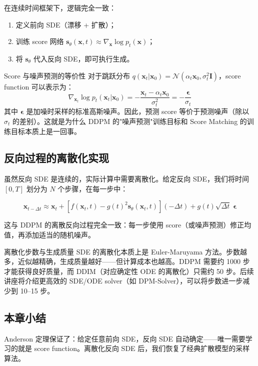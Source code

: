 在连续时间框架下，逻辑完全一致：
\begin{enumerate}
    \item 定义前向 SDE（漂移 + 扩散）；
    \item 训练 score 网络 $\mathbf{s}_\theta(\mathbf{x}, t) \approx \nabla_{\mathbf{x}} \log p_t(\mathbf{x})$；
    \item 将 $\mathbf{s}_\theta$ 代入反向 SDE，即可执行生成。
\end{enumerate}

\begin{knowledgebox}{Score 与噪声预测的等价性}
对于跳跃分布 $q(\mathbf{x}_t | \mathbf{x}_0) = \mathcal{N}(\alpha_t \mathbf{x}_0, \sigma_t^2 \mathbf{I})$，score function 可以表示为：
$$
\nabla_{\mathbf{x}_t} \log p_t(\mathbf{x}_t | \mathbf{x}_0) = -\frac{\mathbf{x}_t - \alpha_t \mathbf{x}_0}{\sigma_t^2} = -\frac{\boldsymbol{\epsilon}}{\sigma_t}
$$
其中 $\boldsymbol{\epsilon}$ 是加噪时采样的标准高斯噪声。因此，预测 score 等价于预测噪声（除以 $\sigma_t$ 的差别）。这就是为什么 DDPM 的"噪声预测"训练目标和 Score Matching 的训练目标本质上是一回事。
\end{knowledgebox}

\subsection{反向过程的离散化实现}

虽然反向 SDE 是连续的，实际计算中需要离散化。给定反向 SDE，我们将时间 $[0, T]$ 划分为 $N$ 个步骤，在每一步中：

$$
\mathbf{x}_{t-\Delta t} \approx \mathbf{x}_t + \left[f(\mathbf{x}_t, t) - g(t)^2 \mathbf{s}_\theta(\mathbf{x}_t, t)\right](-\Delta t) + g(t)\sqrt{\Delta t}\;\boldsymbol{\epsilon}
$$

这与 DDPM 的离散反向过程完全一致：每一步使用 score（或噪声预测）修正均值，再添加适当的随机噪声。

\begin{warningbox}{离散化步数与生成质量}
SDE 的离散化本质上是 Euler-Maruyama 方法。步数越多，近似越精确，生成质量越好——但计算成本也越高。DDPM 需要约 1000 步才能获得良好质量，而 DDIM（对应确定性 ODE 的离散化）只需约 50 步。后续讲座将介绍更高效的 SDE/ODE solver（如 DPM-Solver），可以将步数进一步减少到 10--15 步。
\end{warningbox}

\subsection{本章小结}

Anderson 定理保证了：给定任意前向 SDE，反向 SDE 自动确定——唯一需要学习的就是 score function。离散化反向 SDE 后，我们恢复了经典扩散模型的采样算法。


